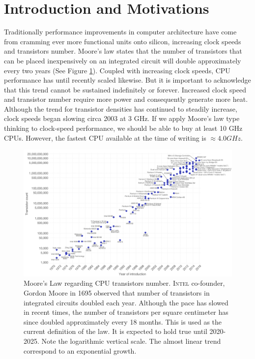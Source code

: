 \section{Introduction and Motivations}
Traditionally performance improvements in computer architecture have come from cramming ever more functional units onto silicon, increasing clock speeds and transistors number. Moore's law states that the number of transistors that can be placed inexpensively on an integrated circuit will double approximately every two years (See Figure \ref{fig:moore}). Coupled with increasing clock speeds, CPU performance has until recently scaled likewise. But it is important to acknowledge that this trend cannot be sustained indefinitely or forever. Increased clock speed and transistor number require more power and consequently generate more heat. Although the trend for transistor densities has continued to steadily increase, clock speeds began slowing circa 2003 at 3 GHz. If we apply Moore’s law type thinking to clock-speed performance, we should be able to buy at least 10 GHz CPUs. However, the fastest CPU available at the time of writing is $\approx 4.0 GHz$.
\begin{figure}[!htbp]
		\hspace*{-1.8cm}
\centering
\includegraphics[width=1.2\textwidth]{./images/parallel_programming/moore_law2}
\caption[Moore's Law regarding CPU transistors number.]{Moore's Law regarding CPU transistors number. \textsc{Intel} co-founder, Gordon Moore in 1695 observed that number of transistors in integrated circuits doubled each year. Although the pace has slowed in recent times, the number of transistors per square centimeter has since doubled approximately every 18 months. This is used as the current definition of the law. It is expected to hold true until 2020-2025. Note the logarithmic vertical scale. The almost linear trend correspond to an exponential growth.
}
\label{fig:moore}
\end{figure}
